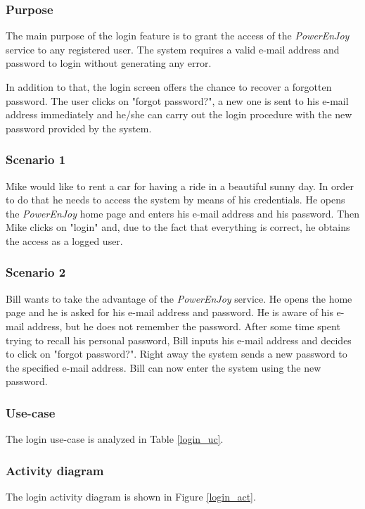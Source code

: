 \subsubsection{Purpose}
The main purpose of the login feature is to grant the access of the \emph{PowerEnJoy} service to any registered user. The system requires a valid e-mail address and password to login without generating any error.

In addition to that, the login screen offers the chance to recover a forgotten password. The user clicks on "forgot password?", a new one is sent to his e-mail address immediately and he/she can carry out the login procedure with the new password provided by the system.

\subsubsection{Scenario 1}
Mike would like to rent a car for having a ride in a beautiful sunny day. In order to do that he needs to access the system by means of his credentials. He opens the \emph{PowerEnJoy} home page and enters his e-mail address and his password. Then Mike clicks on "login" and, due to the fact that everything is correct, he obtains the access as a logged user.

\subsubsection{Scenario 2}
Bill wants to take the advantage of the \emph{PowerEnJoy} service. He opens the home page and he is asked for his e-mail address and password. He is aware of his e-mail address, but he does not remember the password. After some time spent trying to recall his personal password, Bill inputs his e-mail address and decides to click on "forgot password?". Right away the system sends a new password to the specified e-mail address. Bill can now enter the system using the new password.

\subsubsection{Use-case}
The login use-case is analyzed in Table \ref{login_uc}.

\subsubsection{Activity diagram}
The login activity diagram is shown in Figure \ref{login_act}.

